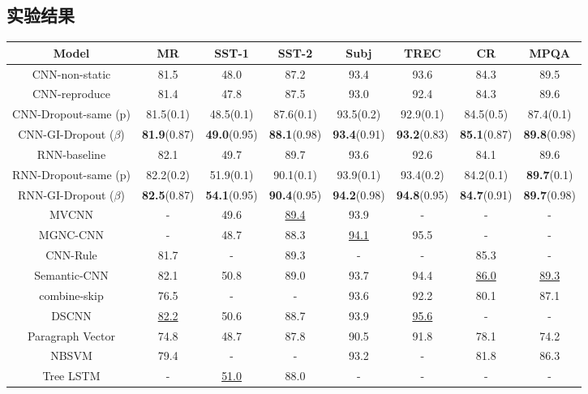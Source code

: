 \subsection{实验结果}

\begin{table}[t]
\begin{small}
\tabcolsep=0.11cm

\centering
\begin{tabular}{c |ccccccc}
\hline
\bfseries Model             & MR   & SST-1 & SST-2 & Subj & TREC &  CR  & MPQA\\
\hline
CNN-non-static & 81.5 & 48.0  & 87.2  & 93.4 & 93.6 & 84.3 & 89.5\\
\hline
CNN-reproduce       & 81.4 & 47.8  & 87.5  & 93.0 & 92.4 & 84.3 & 89.6\\
CNN-Dropout-same (p)       &  81.5(0.1) & 48.5(0.1)  & 87.6(0.1)  & 93.5(0.2) & 92.9(0.1)& 84.5(0.5) & 87.4(0.1)\\

CNN-GI-Dropout ($\beta$) & \textbf{81.9}(0.87) & \textbf{49.0}(0.95)  & \textbf{88.1}(0.98)  & \textbf{93.4}(0.91) & \textbf{93.2}(0.83) & \textbf{85.1}(0.87) & \textbf{89.8}(0.98)\\

\hline
\hline
RNN-baseline & 82.1 & 49.7  & 89.7  & 93.6 & 92.6 & 84.1 & 89.6\\
RNN-Dropout-same (p) & 82.2(0.2) & 51.9(0.1)  & 90.1(0.1)  & 93.9(0.1) & 93.4(0.2) & 84.2(0.1) & \textbf{89.7}(0.1)\\
RNN-GI-Dropout ($\beta$) & \textbf{82.5}(0.87) & \textbf{54.1}(0.95)  & \textbf{90.4}(0.95)  & \textbf{94.2}(0.98) & \textbf{94.8}(0.95) & \textbf{84.7}(0.91) & \textbf{89.7}(0.98)\\

\hline
\hline
MVCNN & - & 49.6 & \underline{89.4} & 93.9 & - & - & -\\ 
MGNC-CNN & - & 48.7 & 88.3 & \underline{94.1} & 95.5 & - & -\\ 
CNN-Rule & 81.7 & - & 89.3 & - & - & 85.3 & -\\ 
Semantic-CNN & 82.1 & 50.8 & 89.0 & 93.7 & 94.4 & \underline{86.0} & \underline{89.3}\\ 
combine-skip & 76.5 & - & - & 93.6 & 92.2 & 80.1 & 87.1\\ 
DSCNN & \underline{82.2} & 50.6 & 88.7 & 93.9 & \underline{95.6} & - & -\\ 
Paragraph Vector & 74.8 & 48.7 & 87.8 & 90.5 & 91.8 & 78.1 & 74.2\\ 
NBSVM & 79.4 & - & - & 93.2 & - & 81.8 & 86.3\\ 
Tree LSTM & - & \underline{51.0} & 88.0 & - & - & - & -\\ 
\hline
\end{tabular}


\end{small}
\end{table}
